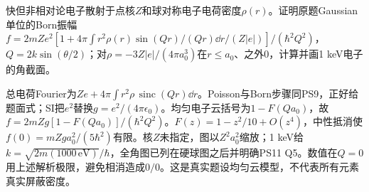 \begin{exercise}
快但非相对论电子散射于点核$Z$和球对称电子电荷密度$\rho(r)$。证明原题Gaussian单位的Born振幅
$f=2mZe^2[1+4\pi\int r^2\rho(r)\sin(Qr)/(Qr)\dd r/(Z|e|)]/(\hbar^2Q^2)$，$Q=2k\sin(\theta/2)$；对$\rho=-3Z|e|/(4\pi a_0^3)$在$r\le a_0$、之外0，计算并画1 keV电子的角截面。
\end{exercise}
\begin{solution}
总电荷Fourier为$Ze+4\pi\int r^2\rho\,\operatorname{sinc}(Qr)\dd r$。Poisson与Born步骤同PS9，正好给题面式；SI把$e^2$替换$g=e^2/(4\pi\epsilon_0)$。均匀电子云括号为$1-F(Qa_0)$，故
$f=2mZg[1-F(Qa_0)]/(\hbar^2Q^2)$。$F(z)=1-z^2/10+O(z^4)$，中性抵消使$f(0)=mZga_0^2/(5\hbar^2)$有限。核$Z$未指定，图以$Z^2a_0^2$缩放；1 keV给$k=\sqrt{2m(1000\,\mathrm{eV})}/\hbar$，全角图已列在硬球图之后并明确PS11 Q5。数值在$Q=0$用上述解析极限，避免相消造成$0/0$。这是真实题设均匀云模型，不代表所有元素真实屏蔽密度。
\end{solution}
